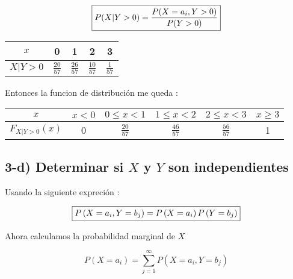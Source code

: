 \documentclass[12pt]{article}
\begin{document}
    \begin{equation*}
        \fbox{$
        \displaystyle P(X|Y>0)=\frac{P(X=a_i,Y>0)}{P(Y>0)}
        $}
    \end{equation*}
  
    \begin{center}
        \renewcommand{\arraystretch}{1.5}
        \begin{tabular}{|c|c|c|c|c|}
            \hline
            $x$ & 0 & 1 & 2& 3\\ \hline
            $X|Y>0$ & $\frac{20}{57}$ & $\frac{26}{57}$ & $\frac{10}{57}$ & $\frac{1}{57}$\\ \hline
        \end{tabular}
    \end{center}
    

    \begin{flushleft}
        Entonces la funcion de distribuci\'on me queda : 
    \end{flushleft}

    \begin{center}
        \renewcommand{\arraystretch}{1.5}
        \begin{tabular}{|c|c|c|c|c|c|}
                \hline
                $x$ & $x<0$ & $0\leq x < 1$ & $1 \leq x< 2$ & $2 \leq x<3$& $x \geq 3$\\ \hline
                $F_{X|Y>0}(x)$ & 0 & $\frac{20}{57}$ & $\frac{46}{57}$ & $\frac{56}{57}$ & 1\\
                \hline
        \end{tabular}
    \end{center}

\subsection*{3-d) Determinar si $X$ y $Y$ son independientes}

Usando la siguiente expreci\'on :


\begin{equation}
    \fbox{$
    \displaystyle P\left(X = a_i,Y = b_j\right)  =  P\left(X = a_i\right) P\left(Y = b_j\right)
    $}
\end{equation}

\begin{flushleft}
    Ahora calculamos la probabilidad marginal de $X$
\end{flushleft}

\begin{equation*}
    \displaystyle P\left(X = a_i\right)  =  \displaystyle \sum_{j=1}^{\infty} P \left(X = a_i,Y = b_j\right)
\end{equation*}
\end{document}
